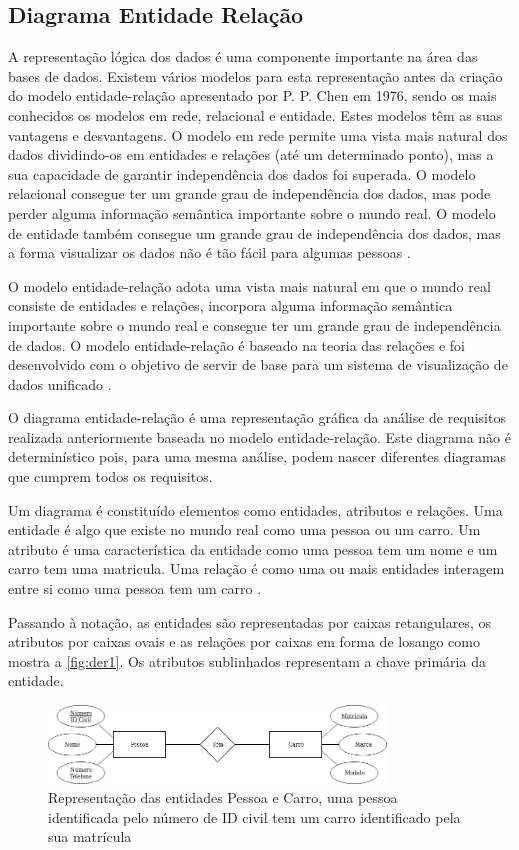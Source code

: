 \documentclass[11pt,twoside,a4paper]{report}
\begin{document}
\subsection{Diagrama Entidade Relação}
\label{subchap:DER}
A representação lógica dos dados é uma componente importante na área das bases de dados. Existem vários modelos para esta representação antes da criação do modelo entidade-relação apresentado por P. P. Chen em 1976, sendo os mais conhecidos os modelos em rede, relacional e entidade. Estes modelos têm as suas vantagens e desvantagens. O modelo em rede permite uma vista mais natural dos dados dividindo-os em entidades e relações (até um determinado ponto), mas a sua capacidade de garantir independência dos dados foi superada. O modelo relacional consegue ter um grande grau de independência dos dados, mas pode perder alguma informação semântica importante sobre o mundo real. O modelo de entidade também consegue um grande grau de independência dos dados, mas a forma visualizar os dados não é tão fácil para algumas pessoas \cite{Chen}.\par
O modelo entidade-relação adota uma vista mais natural em que o mundo real consiste de entidades e relações, incorpora alguma informação semântica importante sobre o mundo real e consegue ter um grande grau de independência de dados. O modelo entidade-relação é baseado na teoria das relações e foi desenvolvido com o objetivo de servir de base para um sistema de visualização de dados unificado \cite{Chen}.\par
O diagrama entidade-relação é uma representação gráfica da análise de requisitos realizada anteriormente baseada no modelo entidade-relação. Este diagrama não é determinístico pois, para uma mesma análise, podem nascer diferentes diagramas que cumprem todos os requisitos.\par
Um diagrama é constituído elementos como entidades, atributos e relações. Uma entidade é algo que existe no mundo real como uma pessoa ou um carro. Um atributo é uma característica da entidade como uma pessoa tem um nome e um carro tem uma matricula. Uma relação é como uma ou mais entidades interagem entre si como uma pessoa tem um carro \cite{Chen}.\par 
Passando à notação, as entidades são representadas por caixas retangulares, os atributos por caixas ovais e as relações por caixas em forma de losango como mostra a \autoref{fig:der1}. Os atributos sublinhados representam a chave primária da entidade.
\begin{figure}[H]
	\begin{center}
		\includegraphics[width=0.8\textwidth]{notacao1} %
		\caption[Representação de entidades, relações e atributos]{Representação das entidades Pessoa e Carro, uma pessoa identificada pelo número de ID civil tem um carro identificado pela sua matrícula}
		\label{fig:der1}
	\end{center}
\end{figure}
\end{document}
